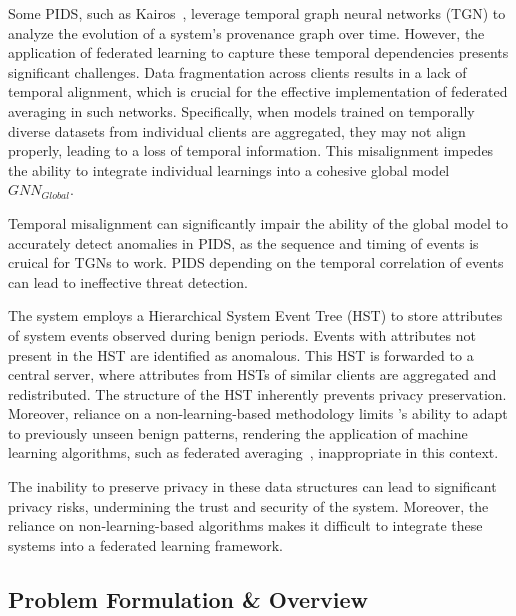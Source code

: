  Some PIDS, such as Kairos~\cite{cheng2023kairos}, leverage temporal graph neural networks (TGN) to analyze the evolution of a system's provenance graph over time. However, the application of federated learning to capture these temporal dependencies presents significant challenges. Data fragmentation across clients results in a lack of temporal alignment, which is crucial for the effective implementation of federated averaging in such networks. Specifically, when models trained on temporally diverse datasets from individual clients are aggregated, they may not align properly, leading to a loss of temporal information. This misalignment impedes the ability to integrate individual learnings into a cohesive global model \( GNN_{Global} \).

Temporal misalignment can significantly impair the ability of the global model to accurately detect anomalies in PIDS, as the sequence and timing of events is cruical for TGNs to work. PIDS depending on the temporal correlation of events can lead to ineffective threat detection.

 The \disdet system employs a Hierarchical System Event Tree (HST) to store attributes of system events observed during benign periods. Events with attributes not present in the HST are identified as anomalous. This HST is forwarded to a central server, where attributes from HSTs of similar clients are aggregated and redistributed. The structure of the HST inherently prevents privacy preservation. Moreover, reliance on a non-learning-based methodology limits \disdet's ability to adapt to previously unseen benign patterns, rendering the application of machine learning algorithms, such as federated averaging~\cite{mcmahan2017communication}, inappropriate in this context.

The inability to preserve privacy in these data structures can lead to significant privacy risks, undermining the trust and security of the system. Moreover, the reliance on non-learning-based algorithms makes it difficult to integrate these systems into a federated learning framework.

\subsection{Problem Formulation \& Overview}


